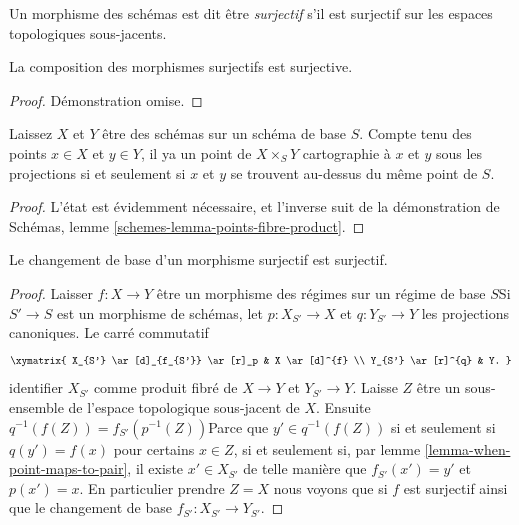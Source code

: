 \begin{definition}

\label{definition-surjective}

Un morphisme des schémas est dit être {\it surjectif} s'il est surjectif sur les espaces topologiques sous-jacents.

\end{definition}

\begin{lemma}

\label{lemma-composition-surjective}

La composition des morphismes surjectifs est surjective.

\end{lemma}

\begin{proof}
Démonstration omise.
\end{proof}

\begin{lemma}

\label{lemma-when-point-maps-to-pair}
Laissez $X$ et $Y$ être des schémas sur un schéma de base $S$. Compte tenu des points $x \in X$ et $y \in Y$, il ya un point de $X \times_S Y$ cartographie à $x$ et $y$ sous les projections si et seulement si $x$ et $y$ se trouvent au-dessus du même point de $S$.
\end{lemma}

\begin{proof}
L'état est évidemment nécessaire, et l'inverse suit de la démonstration de Schémas, lemme \ref{schemes-lemma-points-fibre-product}.
\end{proof}

\begin{lemma}

\label{lemma-base-change-surjective}
Le changement de base d'un morphisme surjectif est surjectif.
\end{lemma}

\begin{proof}

Laisser $f: X \to Y$ être un morphisme des régimes sur un régime de base $S$Si $S' \to S$ est un morphisme de schémas, let $p: X_{S'} \to X$
et $q: Y_{S'} \to Y$ les projections canoniques. Le carré commutatif
$$
\xymatrix{
X_{S'} \ar[d]_{f_{S'}} \ar[r]_p & X \ar[d]^{f} \\
Y_{S'} \ar[r]^{q} & Y.
}
$$
identifier $X_{S'}$ comme produit fibré de $X \to Y$ et
$Y_{S'} \to Y$. Laisse $Z$ être un sous-ensemble de l'espace topologique sous-jacent de $X$. Ensuite $q^{-1}(f(Z)) = f_{S'}(p^{-1}(Z))$Parce que
$y' \in q^{-1}(f(Z))$ si et seulement si $q(y') = f(x)$ pour certains $x \in Z$, si et seulement si, par lemme \ref{lemma-when-point-maps-to-pair}, il existe
$x' \in X_{S'}$ de telle manière que $f_{S'}(x') = y'$ et $p(x') = x$. En particulier prendre $Z = X$ nous voyons que si $f$ est surjectif ainsi que le changement de base
$f_{S'}: X_{S'} \to Y_{S'}$.

\end{proof}


